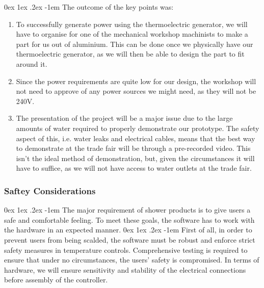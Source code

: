 \documentclass[12pt, a4paper]{article}
\makeatletter
\renewcommand\paragraph{\@startsection{paragraph}{5}{\parindent}%
  {0ex \@plus1ex \@minus.2ex}%
  {-1em}%
  {\normalfont\normalsize\bfseries}}
\makeatother
\begin{document}
            \paragraph{}
                The outcome of the key points was:
                \begin{enumerate}
                    \item To successfully generate power using the thermoelectric generator, we will have to organise for one of the mechanical workshop machinists 
                    to make a part for us out of aluminium. This can be done once we physically have our thermoelectric generator, as we will then be able to design 
                    the part to fit around it.
                    \item Since the power requirements are quite low for our design, the workshop will not need to approve of any power sources we might need, as 
                    they will not be 240V.
                    \item The presentation of the project will be a major issue due to the large amounts of water required to properly demonstrate our prototype. 
                    The safety aspect of this, i.e. water leaks and electrical cables, means that the best way to demonstrate at the trade fair will be through a 
                    pre-recorded video. This isn’t the ideal method of demonstration, but, given the circumstances it will have to suffice, as we will not have access 
                    to water outlets at the trade fair.
                \end{enumerate}
        \subsubsection{Saftey Considerations}
            \paragraph{}
                The major requirement of shower products is to give users a safe and comfortable feeling. To meet these goals, the software has to work with the 
                hardware in an expected manner.
            \paragraph{}
                First of all, in order to prevent users from being scalded, the software must be robust and enforce strict safety measures in temperature controls. 
                Comprehensive testing is required to ensure that under no circumstances, the users’ safety is compromised. In terms of hardware, we will ensure 
                sensitivity and stability of the electrical connections before assembly of the controller.
\end{document}
